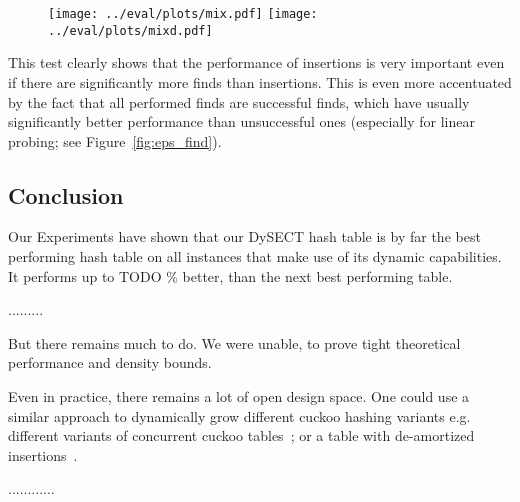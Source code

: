 \documentclass[a4paper,UKenglish]{lipics-v2016}
\begin{document}
\begin{figure}[ht]
  \centering
  \texttt{[image: ../eval/plots/mix.pdf]}
  \texttt{[image: ../eval/plots/mixd.pdf]}
  \caption{\label{fig:mix} }
\end{figure}

This test clearly shows that the
performance of insertions is very important even if there are
significantly more finds than insertions.  This is even more
accentuated by the fact that all performed finds are successful finds,
which have usually significantly better performance than unsuccessful
ones (especially for linear probing; see Figure~\ref{fig:eps_find}).

\subsection{Conclusion}
Our Experiments have shown that our DySECT hash table is by far the
best performing hash table on all instances that make use of its
dynamic capabilities.  It performs up to TODO $\%$ better, than the
next best performing table.


.........


But there remains much to do. We were unable, to prove tight
theoretical performance and density bounds.

Even in practice, there remains a lot of open design space.  One could
use a similar approach to dynamically grow different cuckoo hashing
variants e.g. different variants of concurrent cuckoo
tables~\cite{AlgorithmicImprovementsForFastConcurrentCuckooHashing,
  LockFreeCuckooHashing}; or a table with de-amortized
insertions~\cite{UsingAQueueToDeAmortizeCuckooHashingInHardware,
  DeAmortizedCuckooHashingProvableWorstCasePerformanceAndExperimentalResults}.

............





\end{document}
